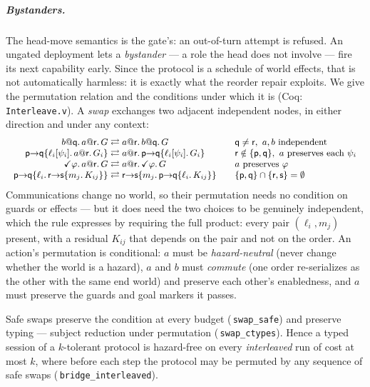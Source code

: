 \documentclass[a4paper,UKenglish,cleveref,autoref,thm-restate,anonymous]{lipics-v2021}
\newcommand{\coqok}[1]{\textcolor{okgreen}{\ding{51}}\,\texttt{\small #1}}
\begin{document}
\subparagraph*{Bystanders.} The head-move semantics is the gate's: an
out-of-turn attempt is refused. An ungated deployment lets a \emph{bystander}
--- a role the head does not involve --- fire its next capability early. Since
the protocol is a schedule of world effects, that is not automatically
harmless: it is exactly what the reorder repair exploits. We give the
permutation relation and the conditions under which it is (Coq:
\texttt{Interleave.v}). A \emph{swap} exchanges two adjacent independent
nodes, in either direction and under any context:
\[\small
\begin{array}{r@{\;}c@{\;}l@{\qquad}l}
b@\mathsf q.\,a@\mathsf r.\,G &\rightleftarrows& a@\mathsf r.\,b@\mathsf q.\,G
  & \mathsf q\neq\mathsf r,\ a,b\ \text{independent}\\
\mathsf p{\to}\mathsf q\{\ell_i[\psi_i].\,a@\mathsf r.\,G_i\}
  &\rightleftarrows& a@\mathsf r.\,\mathsf p{\to}\mathsf q\{\ell_i[\psi_i].\,G_i\}
  & \mathsf r\notin\{\mathsf p,\mathsf q\},\ a\ \text{preserves each}\ \psi_i\\
\checkmark\varphi.\,a@\mathsf r.\,G &\rightleftarrows& a@\mathsf r.\,\checkmark\varphi.\,G
  & a\ \text{preserves}\ \varphi\\
\mathsf p{\to}\mathsf q\{\ell_i.\,\mathsf r{\to}\mathsf s\{m_j.\,K_{ij}\}\}
  &\rightleftarrows& \mathsf r{\to}\mathsf s\{m_j.\,\mathsf p{\to}\mathsf q\{\ell_i.\,K_{ij}\}\}
  & \{\mathsf p,\mathsf q\}\cap\{\mathsf r,\mathsf s\}=\emptyset
\end{array}
\]
Communications change no world, so their permutation needs no condition on
guards or effects --- but it does need the two choices to be genuinely
independent, which the rule expresses by requiring the full product: every
pair $(\ell_i,m_j)$ present, with a residual $K_{ij}$ that depends on the pair
and not on the order. An action's permutation is conditional: $a$ must be \emph{hazard-neutral} (never change whether the
world is a hazard), $a$ and $b$ must \emph{commute} (one order re-serializes as
the other with the same end world) and preserve each other's enabledness, and
$a$ must preserve the guards and goal markers it passes.

\begin{theorem}[Bystanders]\label{thm:bystander}
Safe swaps preserve the condition at every budget (\coqok{swap\_safe}) and
preserve typing --- subject reduction under permutation
(\coqok{swap\_ctypes}). Hence a typed session of a $k$-tolerant protocol is
hazard-free on every \emph{interleaved} run of cost at most $k$, where before
each step the protocol may be permuted by any sequence of safe swaps
(\coqok{bridge\_interleaved}).
\end{theorem}
\end{document}

